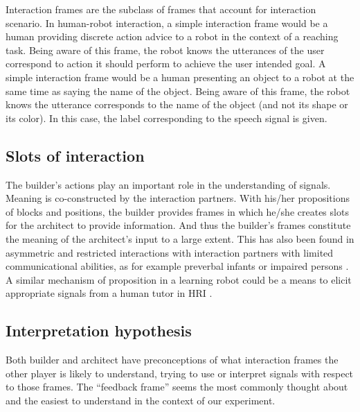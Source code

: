 Interaction frames are the subclass of frames that account for interaction scenario. In human-robot interaction, a simple interaction frame would be a human providing discrete action advice to a robot in the context of a reaching task. Being aware of this frame, the robot knows the utterances of the user correspond to action it should perform to achieve the user intended goal. A simple interaction frame would be a human presenting an object to a robot at the same time as saying the name of the object. Being aware of this frame, the robot knows the utterance corresponds to the name of the object (and not its shape or its color). In this case, the label corresponding to the speech signal is given.

\subsection{Slots of interaction}

The builder's actions play an important role in the understanding of signals. Meaning is co-constructed by the interaction partners. With his/her propositions of blocks and positions, the builder provides frames in which he/she creates slots for the architect to provide information. And thus the builder's frames constitute the meaning of the architect's input to a large extent. This has also been found in asymmetric and restricted interactions with interaction partners with limited communicational abilities, as for example preverbal infants or impaired persons \cite{ochs1979propositions, goodwin1995co}. A similar mechanism of proposition in a learning robot could be a means to elicit appropriate signals from a human tutor in HRI \cite{cakmak2012designing,vollmer2014robots,cangelosi2010integration}.

\subsection{Interpretation hypothesis}
\label{chapter:humanexperiment:interpretationhypothesis}

Both builder and architect have preconceptions of what interaction frames the other player is likely to understand, trying to use or interpret signals with respect to those frames. The ``feedback frame'' seems the most commonly thought about and the easiest to understand in the context of our experiment.

